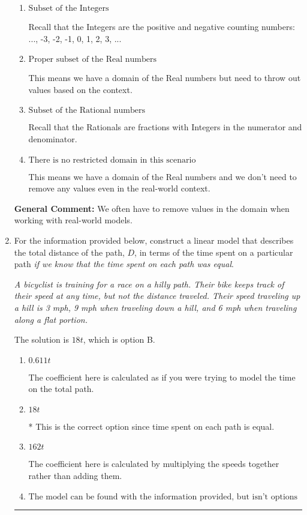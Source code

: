 \documentclass{extbook}[14pt]
\newcommand{\litem}[1]{\item #1

\rule{\textwidth}{0.4pt}}
\begin{document}
\begin{enumerate}
{\begin{enumerate}[label=\Alph*.]
Recall that the Naturals are the counting numbers: 1, 2, 3, ...
\item \( \text{Subset of the Integers} \)

Recall that the Integers are the positive and negative counting numbers: ..., -3, -2, -1, 0, 1, 2, 3, ... 
\item \( \text{Proper subset of the Real numbers} \)

This means we have a domain of the Real numbers but need to throw out values based on the context.
\item \( \text{Subset of the Rational numbers} \)

Recall that the Rationals are fractions with Integers in the numerator and denominator.
\item \( \text{There is no restricted domain in this scenario} \)

This means we have a domain of the Real numbers and we don't need to remove any values even in the real-world context.
\end{enumerate}

\textbf{General Comment:} We often have to remove values in the domain when working with real-world models.
}
\litem{
For the information provided below, construct a linear model that describes the total distance of the path, $D$, in terms of the time spent on a particular path \textit{if we know that the time spent on each path was equal}.

\begin{center}
    \textit{ A bicyclist is training for a race on a hilly path. Their bike keeps track of their speed at any time, but not the distance traveled. Their speed traveling up a hill is 3 mph, 9 mph when traveling down a hill, and 6 mph when traveling along a flat portion. }
\end{center}
The solution is \( 18 t \), which is option B.\begin{enumerate}[label=\Alph*.]
\item \( 0.611 t \)

The coefficient here is calculated as if you were trying to model the time on the total path.
\item \( 18 t \)

* This is the correct option since time spent on each path is equal.
\item \( 162 t \)

The coefficient here is calculated by multiplying the speeds together rather than adding them.
\item \( \text{The model can be found with the information provided, but isn't options 1-3.} \)


\end{enumerate}}
\end{enumerate}
\end{document}
